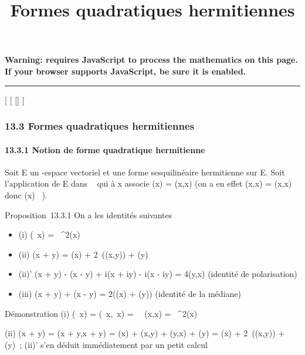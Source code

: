 \documentclass[]{article}
\title{Formes quadratiques hermitiennes}
\author{}
\date{}
\begin{document}
\maketitle

\textbf{Warning: 
requires JavaScript to process the mathematics on this page.\\ If your
browser supports JavaScript, be sure it is enabled.}

\begin{center}\rule{3in}{0.4pt}\end{center}

{[}
{[}
{[}{]}
{[}

\subsubsection{13.3 Formes quadratiques hermitiennes}

\paragraph{13.3.1 Notion de forme quadratique hermitienne}

Soit E un -espace vectoriel et \phi une forme sesquilinéaire hermitienne
sur E. Soit \Phi l'application de E dans ~ qui à x associe \Phi(x) = \phi(x,x)
(on a en effet \phi(x,x) = \overline\phi(x,x) donc \Phi(x) \in
{}~).

Proposition~13.3.1 On a les identités suivantes

\begin{itemize}
\itemsep1pt\parskip0pt
\item
  (i) \Phi(\lambda~x) = \textbar{}\lambda~\textbar{}^2\Phi(x)
\item
  (ii) \Phi(x + y) = \Phi(x) +
  2\mathrmRe~(\phi(x,y)) + \Phi(y)
\item
  (ii)' \Phi(x + y) - \Phi(x - y) + i\Phi(x + iy) - i\Phi(x - iy) = 4\phi(y,x)
  (identité de polarisation)
\item
  (iii) \Phi(x + y) + \Phi(x - y) = 2(\Phi(x) + \Phi(y)) (identité de la médiane)
\end{itemize}

Démonstration (i) \Phi(\lambda~x) = \phi(\lambda~x,\lambda~x) =
\lambda~\overline\lambda~\phi(x,x) =
\textbar{}\lambda~\textbar{}^2\Phi(x)

(ii) \Phi(x + y) = \phi(x + y,x + y) = \Phi(x) + \phi(x,y) + \phi(y,x) + \Phi(y) = \Phi(x) +
2\mathrmRe~(\phi(x,y)) + \Phi(y)~;
(ii)' s'en déduit immédiatement par un petit calcul
\end{document}
